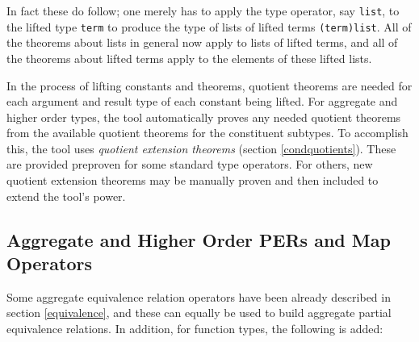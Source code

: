 \documentclass[envcountsame,runningheads]{llncs}
\newcommand{\quotient}{partial equivalence}
\begin{document}
In fact these do follow; one merely has to apply the type
operator, say {\tt list}, to the lifted type {\tt term} to produce
the type of lists of lifted terms {\tt (term)list}.  All of the
theorems about lists in general now apply to lists of lifted terms,
and all of the theorems about lifted terms apply to the elements of
these lifted lists.
\begin{comment}
\end{comment}

In the process of lifting constants and theorems,
quotient theorems are needed for each
argument and result type
of each constant being lifted.
For aggregate and higher order types,
the tool automatically proves any needed quotient theorems
from the available quotient theorems for the 
constituent subtypes. 
To accomplish this, the tool uses {\it quotient extension theorems\/}
(section \ref{condquotients}). 
These are provided preproven for some standard type operators.
For others,
new quotient extension theorems may be manually proven and then
included to extend the tool's power.
\begin{comment}
\end{comment}


%
\subsection{Aggregate and Higher Order PERs and Map Operators}
%
\label{aggregates}

Some aggregate equivalence relation
operators have been already described in section \ref{equivalence}, and
these can equally be used to build aggregate \quotient{} relations. 
In addition, for function types, the following is added:

\begin{center}
\end{center}
\end{document}
